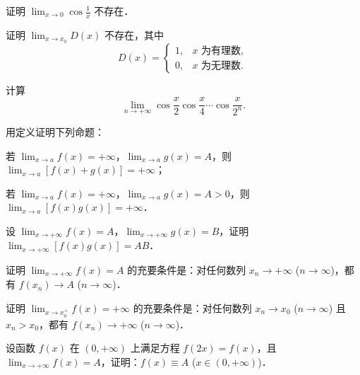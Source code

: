 \begin{xiti}
\item 证明 $\lim_{x \to 0} \cos\frac{1}{x}$ 不存在．

\item 证明 $\lim_{x \to x_0} D(x)$ 不存在，其中
\[
D(x) = \begin{cases}
1, & x \text{ 为有理数}, \\
0, & x \text{ 为无理数}.
\end{cases}
\]

\item 计算
\[
\lim_{n \to +\infty} \cos\frac{x}{2}\cos\frac{x}{4}\cdots\cos\frac{x}{2^n}.
\]

\item 用定义证明下列命题：
\begin{ziti}
\item 若 $\lim_{x \to a} f(x) = +\infty$，$\lim_{x \to a} g(x) = A$，则 $\lim_{x \to a} [f(x) + g(x)] = +\infty$；
\item 若 $\lim_{x \to a} f(x) = +\infty$，$\lim_{x \to a} g(x) = A > 0$，则 $\lim_{x \to a} [f(x)g(x)] = +\infty$．
\end{ziti}

\item 设 $\lim_{x \to +\infty} f(x) = A$，$\lim_{x \to +\infty} g(x) = B$，证明 $\lim_{x \to +\infty} [f(x)g(x)] = AB$．

\item 证明 $\lim_{x \to +\infty} f(x) = A$ 的充要条件是：对任何数列 $x_n \to +\infty$ ($n \to \infty$)，都有 $f(x_n) \to A$ ($n \to \infty$)．

\item 证明 $\lim_{x \to x_0^+} f(x) = +\infty$ 的充要条件是：对任何数列 $x_n \to x_0$ ($n \to \infty$) 且 $x_n > x_0$，都有 $f(x_n) \to +\infty$ ($n \to \infty$)．

\item 设函数 $f(x)$ 在 $(0, +\infty)$ 上满足方程 $f(2x) = f(x)$，且 $\lim_{x \to +\infty} f(x) = A$，证明：$f(x) \equiv A$ ($x \in (0, +\infty)$)．
\end{xiti}
